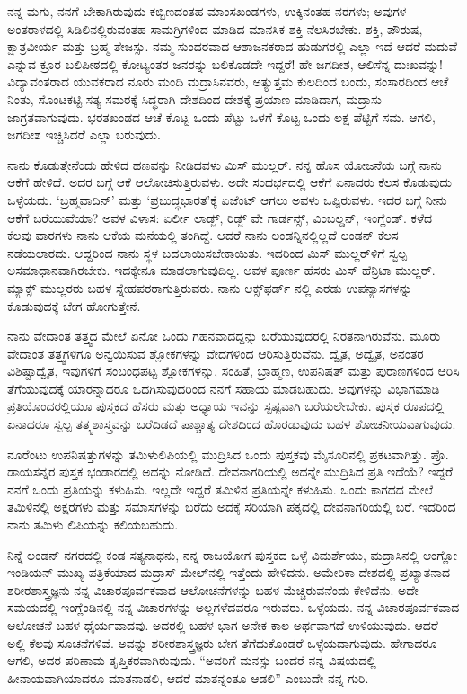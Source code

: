 ನನ್ನ ಮಗು, ನನಗೆ ಬೇಕಾಗಿರುವುದು ಕಬ್ಬಿಣದಂತಹ ಮಾಂಸಖಂಡಗಳು, ಉಕ್ಕಿನಂತಹ ನರಗಳು; ಅವುಗಳ ಅಂತರಾಳದಲ್ಲಿ ಸಿಡಿಲಿನಲ್ಲಿರುವಂತಹ ಸಾಮಗ್ರಿಗಳಿಂದ ಮಾಡಿದ ಮಾನಸಿಕ ಶಕ್ತಿ ನೆಲಸಿರಬೇಕು. ಶಕ್ತಿ, ಪೌರುಷ, ಕ್ಷಾತ್ರವೀರ್ಯ ಮತ್ತು ಬ್ರಹ್ಮ ತೇಜಸ್ಸು. ನಮ್ಮ ಸುಂದರವಾದ ಆಶಾಜನಕರಾದ ಹುಡುಗರಲ್ಲಿ ಎಲ್ಲಾ ಇದೆ\enginline{-} ಆದರೆ ಮದುವೆ ಎನ್ನುವ ಕ್ರೂರ ಬಲಿಪೀಠದಲ್ಲಿ ಕೋಟ್ಯಂತರ ಜನರನ್ನು ಬಲಿಕೊಡದೇ ಇದ್ದರೆ! ಹೇ ಜಗದೀಶ, ಆಲಿಸೆನ್ನ ದುಃಖವನ್ನು! ವಿದ್ಯಾವಂತರಾದ ಯುವಕರಾದ ನೂರು ಮಂದಿ ಮದ್ರಾಸಿನವರು, ಅತ್ಯುತ್ತಮ ಕುಲದಿಂದ ಬಂದು, ಸಂಸಾರದಿಂದ ಆಚೆ ನಿಂತು, ಸೊಂಟಕಟ್ಟಿ ಸತ್ಯ ಸಮರಕ್ಕೆ ಸಿದ್ಧರಾಗಿ ದೇಶದಿಂದ ದೇಶಕ್ಕೆ ಪ್ರಯಾಣ ಮಾಡಿದಾಗ, ಮದ್ರಾಸು ಜಾಗ್ರತವಾಗುವುದು. ಭರತಖಂಡದ ಆಚೆ ಕೊಟ್ಟ ಒಂದು ಪೆಟ್ಟು ಒಳಗೆ ಕೊಟ್ಟ ಒಂದು ಲಕ್ಷ ಪೆಟ್ಟಿಗೆ ಸಮ. ಆಗಲಿ, ಜಗದೀಶ ಇಚ್ಚಿಸಿದರೆ ಎಲ್ಲಾ ಬರುವುದು.

ನಾನು ಕೊಡುತ್ತೇನೆಂದು ಹೇಳಿದ ಹಣವನ್ನು ನೀಡಿದವಳು ಮಿಸ್ ಮುಲ್ಲರ್. ನನ್ನ ಹೊಸ ಯೋಜನೆಯ ಬಗ್ಗೆ ನಾನು ಆಕೆಗೆ ಹೇಳಿದೆ. ಅದರ ಬಗ್ಗೆ ಆಕೆ ಆಲೋಚಿಸುತ್ತಿರುವಳು. ಅದೇ ಸಂದರ್ಭದಲ್ಲಿ ಆಕೆಗೆ ಏನಾದರು ಕೆಲಸ ಕೊಡುವುದು ಒಳ್ಳೆಯದು. ‘ಬ್ರಹ್ಮವಾದಿನ್’ ಮತ್ತು ‘ಪ್ರಬುದ್ಧಭಾರತ’ಕ್ಕೆ ಏಜೆಂಟ್ ಆಗಲು ಅವಳು ಒಪ್ಪಿರುವಳು. ಇದರ ಬಗ್ಗೆ ನೀನು ಆಕೆಗೆ ಬರೆಯುವೆಯಾ? ಅವಳ ವಿಳಾಸ: ಏರ್ಲೀ ಲಾಡ್ಜ್, ರಿಡ್ಜ್ ವೇ ಗಾರ್ಡನ್ಸ್, ವಿಂಬಲ್ಡನ್, ಇಂಗ್ಲೆಂಡ್. ಕಳೆದ ಕೆಲವು ವಾರಗಳು ನಾನು ಆಕೆಯ ಮನೆಯಲ್ಲಿ ತಂಗಿದ್ದೆ. ಆದರೆ ನಾನು ಲಂಡನ್ನಿನಲ್ಲಿಲ್ಲದೆ ಲಂಡನ್ ಕೆಲಸ ನಡೆಯಲಾರದು. ಆದ್ದರಿಂದ ನಾನು ಸ್ಥಳ ಬದಲಾಯಿಸಬೇಕಾಯಿತು. ಇದರಿಂದ ಮಿಸ್ ಮುಲ್ಲರ್‌ಳಿಗೆ ಸ್ವಲ್ಪ ಅಸಮಾಧಾನವಾಗಿರಬೇಕು. ಇದಕ್ಕೇನೂ ಮಾಡಲಾಗುವುದಿಲ್ಲ. ಅವಳ ಪೂರ್ಣ ಹೆಸರು ಮಿಸ್ ಹೆನ್ರಿಟಾ ಮುಲ್ಲರ್. ಮ್ಯಾಕ್ಸ್ ಮುಲ್ಲರರು ಬಹಳ ಸ್ನೇಹಪರರಾಗುತ್ತಿರುವರು. ನಾನು ಆಕ್ಸ್‌ಫ‌ರ್ಡ್ ನಲ್ಲಿ ಎರಡು ಉಪನ್ಯಾಸಗಳನ್ನು ಕೊಡುವುದಕ್ಕೆ ಬೇಗ ಹೋಗುತ್ತೇನೆ.

ನಾನು ವೇದಾಂತ ತತ್ತ್ವದ ಮೇಲೆ ಏನೋ ಒಂದು ಗಹನವಾದದ್ದನ್ನು ಬರೆಯುವುದರಲ್ಲಿ ನಿರತನಾಗಿರುವೆನು. ಮೂರು ವೇದಾಂತ ತತ್ತ್ವಗಳಿಗೂ ಅನ್ವಯಿಸುವ ಶ್ಲೋಕಗಳನ್ನು ವೇದಗಳಿಂದ ಆರಿಸುತ್ತಿರುವೆನು. ದ್ವೈತ, ಅದ್ವೈತ, ಅನಂತರ ವಿಶಿಷ್ಟಾದ್ವೈತ, ಇವುಗಳಿಗೆ ಸಂಬಂಧಪಟ್ಟ ಶ್ಲೋಕಗಳನ್ನು, ಸಂಹಿತೆ, ಬ್ರಾಹ್ಮಣ, ಉಪನಿಷತ್ ಮತ್ತು ಪುರಾಣಗಳಿಂದ ಆರಿಸಿ ತೆಗೆಯುವುದಕ್ಕೆ ಯಾರನ್ನಾದರೂ ಒದಗಿಸುವುದರಿಂದ ನನಗೆ ಸಹಾಯ ಮಾಡಬಹುದು. ಅವುಗಳನ್ನು ವಿಭಾಗಮಾಡಿ ಪ್ರತಿಯೊಂದರಲ್ಲಿಯೂ ಪುಸ್ತಕದ ಹೆಸರು ಮತ್ತು ಅಧ್ಯಾಯ ಇವನ್ನು ಸ್ಪಷ್ಟವಾಗಿ ಬರೆಯಲೇಬೇಕು. ಪುಸ್ತಕ ರೂಪದಲ್ಲಿ ಏನಾದರೂ ಸ್ವಲ್ಪ ತತ್ತ್ವಶಾಸ್ತ್ರವನ್ನು ಬರೆದಿಡದೆ ಪಾಶ್ಚಾತ್ಯ ದೇಶದಿಂದ ಹೊರಡುವುದು ಬಹಳ ಶೋಚನೀಯವಾಗುವುದು.
\vspace{0.2cm}

ನೂರೆಂಟು ಉಪನಿಷತ್ತುಗಳನ್ನು ತಮಿಳುಲಿಪಿಯಲ್ಲಿ ಮುದ್ರಿಸಿದ ಒಂದು ಪುಸ್ತಕವು ಮೈಸೂರಿನಲ್ಲಿ ಪ್ರಕಟವಾಗಿತ್ತು. ಪ್ರೊ. ಡಾಯಸನ್ನರ ಪುಸ್ತಕ ಭಂಡಾರದಲ್ಲಿ ಅದನ್ನು ನೋಡಿದೆ. ದೇವನಾಗರಿಯಲ್ಲಿ ಅದನ್ನೇ ಮುದ್ರಿಸಿದ ಪ್ರತಿ ಇದೆಯೆ? ಇದ್ದರೆ ನನಗೆ ಒಂದು ಪ್ರತಿಯನ್ನು ಕಳುಹಿಸು. ಇಲ್ಲದೇ ಇದ್ದರೆ ತಮಿಳಿನ ಪ್ರತಿಯನ್ನೇ ಕಳುಹಿಸು. ಒಂದು ಕಾಗದದ ಮೇಲೆ ತಮಿಳಿನಲ್ಲಿ ಅಕ್ಷರಗಳು ಮತ್ತು ಸಮಾಸಗಳನ್ನು ಬರೆದು ಅದಕ್ಕೆ ಸರಿಯಾಗಿ ಪಕ್ಕದಲ್ಲಿ ದೇವನಾಗರಿಯಲ್ಲಿ ಬರೆ. ಇದರಿಂದ ನಾನು ತಮಿಳು ಲಿಪಿಯನ್ನು ಕಲಿಯಬಹುದು.
\vspace{0.2cm}

ನಿನ್ನೆ ಲಂಡನ್ ನಗರದಲ್ಲಿ ಕಂಡ ಸತ್ಯನಾಥನು, ನನ್ನ ರಾಜಯೋಗ ಪುಸ್ತಕದ ಒಳ್ಳೆ ವಿಮರ್ಶೆಯು, ಮದ್ರಾಸಿನಲ್ಲಿ ಆಂಗ್ಲೋ ಇಂಡಿಯನ್ ಮುಖ್ಯ ಪತ್ರಿಕೆಯಾದ ಮದ್ರಾಸ್ ಮೇಲ್‌ನಲ್ಲಿ ಇತ್ತೆಂದು ಹೇಳಿದನು. ಅಮೇರಿಕಾ ದೇಶದಲ್ಲಿ ಪ್ರಖ್ಯಾತನಾದ ಶರೀರಶಾಸ್ತ್ರಜ್ಞನು ನನ್ನ ವಿಚಾರಪೂರ್ವಕವಾದ ಆಲೋಚನೆಗಳನ್ನು ಬಹಳ ಮೆಚ್ಚಿರುವನೆಂದು ಕೇಳಿದೆನು. ಅದೇ ಸಮಯದಲ್ಲಿ ಇಂಗ್ಲೆಂಡಿನಲ್ಲಿ ನನ್ನ ವಿಚಾರಗಳನ್ನು ಅಲ್ಲಗಳೆದವರೂ ಇರುವರು. ಒಳ್ಳೆಯದು. ನನ್ನ ವಿಚಾರಪೂರ್ವಕವಾದ ಆಲೋಚನೆ ಬಹಳ ಧೈರ್ಯವಾದವು. ಅದರಲ್ಲಿ ಬಹಳ ಭಾಗ ಅನೇಕ ಕಾಲ ಅರ್ಥವಾಗದೆ ಉಳಿಯುವುದು. ಆದರೆ ಅಲ್ಲಿ ಕೆಲವು ಸೂಚನೆಗಳಿವೆ. ಅವನ್ನು ಶರೀರಶಾಸ್ತ್ರಜ್ಞರು ಬೇಗ ತೆಗೆದುಕೊಂಡರೆ ಒಳ್ಳೆಯದಾಗುವುದು. ಹೇಗಾದರೂ ಆಗಲಿ, ಅದರ ಪರಿಣಾಮ ತೃಪ್ತಿಕರವಾಗಿರುವುದು. “ಅವರಿಗೆ ಮನಸ್ಸು ಬಂದರೆ ನನ್ನ ವಿಷಯದಲ್ಲಿ ಹೀನಾಯವಾಗಿಯಾದರೂ ಮಾತನಾಡಲಿ, ಆದರೆ ಮಾತನ್ನಂತೂ ಆಡಲಿ” ಎಂಬುದೇ ನನ್ನ ಗುರಿ.
\vspace{0.2cm}

